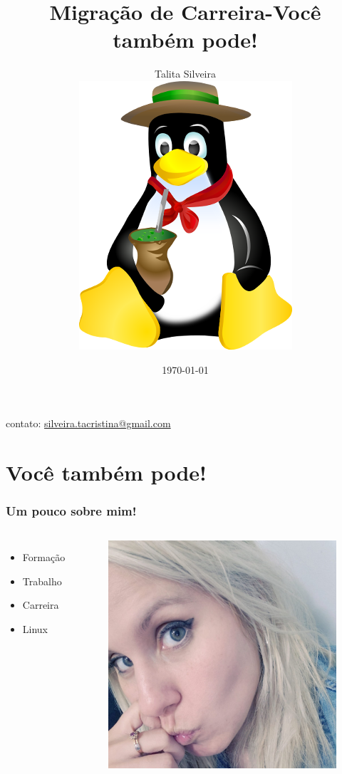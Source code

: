 \documentclass[    
  12pt, 
  compress,
  aspectratio=169,
  blue
  ]{beamer}
\title{Migração de Carreira-Você também pode!}
\author[Talita Silveira]{Talita Silveira\\[2ex] \includegraphics[scale=0.25]{logo}}
\institute{Invillia | PagSeguro}
\date{\today}
\begin{document}
\begin{frame}
\titlepage
{} contato: \url{silveira.tacristina@gmail.com}
\end{frame}
\section[Migração de carreira]{}
\section{Você também pode!}


\begin{frame}
\frametitle{ Um pouco sobre mim!}   
\begin{columns}[c]
\begin{itemize}
\item<1-> Formação 
\item<2-> Trabalho  
\item<3-> Carreira
\item<4-> Linux
\end{itemize}
\centering
\begin{figure}
\includegraphics[scale=0.1]{eu}
\end{figure}
\end{columns}
\end{frame}
\end{document}
